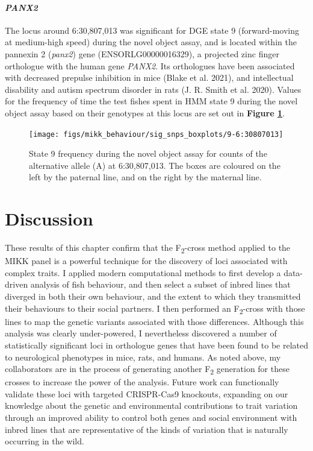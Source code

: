 \documentclass[
]{book}
\begin{document}
\hypertarget{panx2}{%
\paragraph{\texorpdfstring{\emph{PANX2}}{PANX2}}\label{panx2}}

The locus around 6:30,807,013 was significant for DGE state 9 (forward-moving at medium-high speed) during the novel object assay, and is located within the pannexin 2 (\emph{panx2}) gene (ENSORLG00000016329), a projected zinc finger orthologue with the human gene \emph{PANX2}. Its orthologues have been associated with decreased prepulse inhibition in mice (Blake et al. 2021), and intellectual disability and autism spectrum disorder in rats (J. R. Smith et al. 2020). Values for the frequency of time the test fishes spent in HMM state 9 during the novel object assay based on their genotypes at this locus are set out in \textbf{Figure \ref{fig:sig-snp-6-30mb}}.



\begin{figure}
\texttt{[image: figs/mikk\_behaviour/sig\_snps\_boxplots/9-6:30807013]} \caption{State 9 frequency during the novel object assay for counts of the alternative allele (A) at 6:30,807,013. The boxes are coloured on the left by the paternal line, and on the right by the maternal line.}\label{fig:sig-snp-6-30mb}
\end{figure}

\hypertarget{discussion}{%
\section{Discussion}\label{discussion}}

These results of this chapter confirm that the F\textsubscript{2}-cross method applied to the MIKK panel is a powerful technique for the discovery of loci associated with complex traits. I applied modern computational methods to first develop a data-driven analysis of fish behaviour, and then select a subset of inbred lines that diverged in both their own behaviour, and the extent to which they transmitted their behaviours to their social partners. I then performed an F\textsubscript{2}-cross with those lines to map the genetic variants associated with those differences. Although this analysis was clearly under-powered, I nevertheless discovered a number of statistically significant loci in orthologue genes that have been found to be related to neurological phenotypes in mice, rats, and humans. As noted above, my collaborators are in the process of generating another F\textsubscript{2} generation for these crosses to increase the power of the analysis. Future work can functionally validate these loci with targeted CRISPR-Cas9 knockouts, expanding on our knowledge about the genetic and environmental contributions to trait variation through an improved ability to control both genes and social environment with inbred lines that are representative of the kinds of variation that is naturally occurring in the wild.
\end{document}
